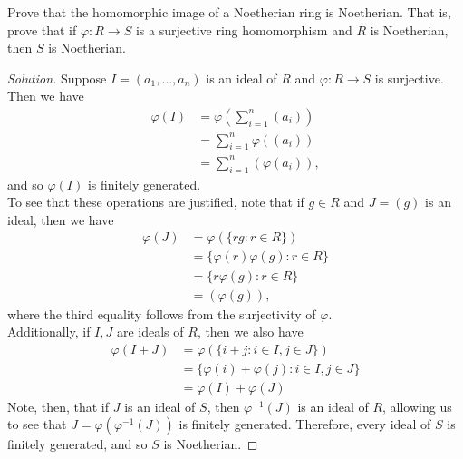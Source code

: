 \documentclass[12pt]{article}
\newenvironment{problem}[2][Problem]{\begin{trivlist}
\item[\hskip \labelsep {\bfseries #1}\hskip \labelsep {\bfseries #2.}]}{\end{trivlist}}
\newenvironment{solution}
  {\renewcommand\qedsymbol{$\blacksquare$}\begin{proof}[Solution]}
{\end{proof}}
\theoremstyle{remark}
\begin{document}
\begin{problem}{4.2}
  Prove that the homomorphic image of a Noetherian ring is Noetherian.
  That is, prove that if $\varphi:R\to S$ is a surjective ring homomorphism and $R$ is Noetherian,
  then $S$ is Noetherian.
\end{problem}
\begin{solution}
  Suppose $I=(a_1,\dots,a_n)$ is an ideal of $R$ and $\varphi:R\to S$ is surjective.
  Then we have
  \begin{align*}
    \varphi(I) &= \varphi\left( \sum_{i=1}^{n} (a_i) \right) \\
    &= \sum_{i=1}^{n}\varphi((a_i)) \\
    &= \sum_{i=1}^{n}(\varphi(a_i)),
  \end{align*}
  and so $\varphi(I)$ is finitely generated.\\
  \indent To see that these operations are justified, note that if $g\in R$ and $J=(g)$ is an ideal,
  then we have
  \begin{align*}
    \varphi(J) &= \varphi\left(  \{rg : r\in R\}\right)\\
    &= \{\varphi(r)\varphi(g) : r\in R\} \\
    &= \{r\varphi(g) : r\in R\} \\ 
    &= (\varphi(g)),
  \end{align*}
  where the third equality follows from the surjectivity of $\varphi$.\\
  \indent Additionally, if $I,J$ are ideals of $R$, then we also have
  \begin{align*}
    \varphi(I+J) &= \varphi(\{i+j : i\in I, j\in J\}) \\
    &= \{\varphi(i)+\varphi(j) : i\in I, j\in J\} \\
    &= \varphi(I)+\varphi(J)
  \end{align*}
  \indent Note, then, that if $J$ is an ideal of $S$, then $\varphi^{-1}(J)$ is an ideal of $R$, allowing
  us to see that $J=\varphi(\varphi^{-1}(J))$ is finitely generated.
  Therefore, every ideal of $S$ is finitely generated, and so $S$ is Noetherian.
\end{solution}
\end{document}
